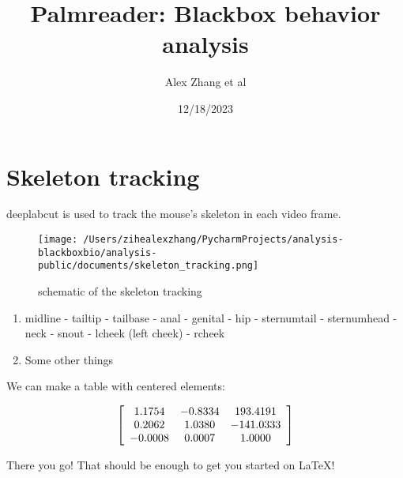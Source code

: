 \documentclass[a4paper,12pt]{article} %
\title{Palmreader: Blackbox behavior analysis}
\author{Alex Zhang et al}
\date{12/18/2023} %
\begin{document}
\maketitle %


\section{Skeleton tracking}

deeplabcut is used to track the mouse's skeleton in each video frame.

\vspace{5mm}

\begin{figure}[!ht]
  \centering
  \texttt{[image: /Users/zihealexzhang/PycharmProjects/analysis-blackboxbio/analysis-public/documents/skeleton\_tracking.png]}
  \caption{schematic of the skeleton tracking}
\end{figure}


\vspace{5mm}
\begin{enumerate}[resume]
\item midline
\newline
- tailtip
- tailbase
- anal
- genital
- hip
- sternumtail
- sternumhead
- neck
- snout
- lcheek  (left cheek)
- rcheek
\item Some other things
\end{enumerate}
\vspace{5mm}


\noindent
We can make a table with centered elements:

\vspace{5mm}
\[ \left[ \begin{array}{c c c}
1.1754 & -0.8334 & 193.4191\\
0.2062 & 1.0380 & -141.0333\\
-0.0008 & 0.0007 & 1.0000\\
\end{array}
\right] \]
\vspace{5mm}

\noindent
There you go! That should be enough to get you started on LaTeX!
\end{document}
